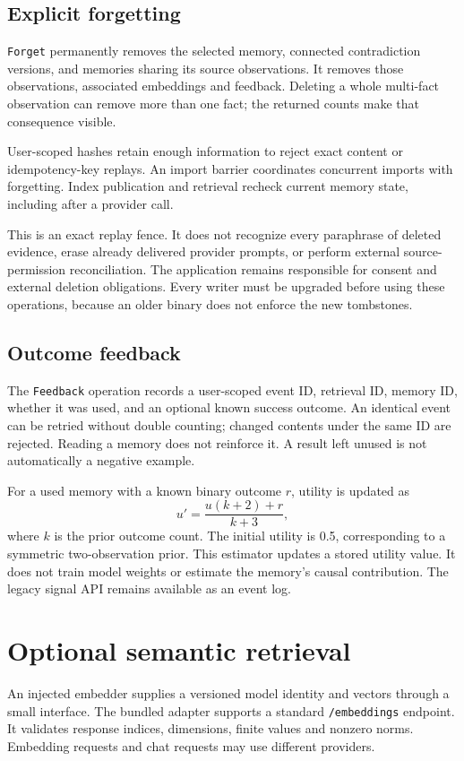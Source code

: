 \documentclass[11pt]{article}
\begin{document}
\subsection{Explicit forgetting}
\texttt{Forget} permanently removes the selected memory, connected contradiction versions, and memories sharing its source observations. It removes those observations, associated embeddings and feedback. Deleting a whole multi-fact observation can remove more than one fact; the returned counts make that consequence visible.

User-scoped hashes retain enough information to reject exact content or idempotency-key replays. An import barrier coordinates concurrent imports with forgetting. Index publication and retrieval recheck current memory state, including after a provider call.

This is an exact replay fence. It does not recognize every paraphrase of deleted evidence, erase already delivered provider prompts, or perform external source-permission reconciliation. The application remains responsible for consent and external deletion obligations. Every writer must be upgraded before using these operations, because an older binary does not enforce the new tombstones.

\subsection{Outcome feedback}
The \texttt{Feedback} operation records a user-scoped event ID, retrieval ID, memory ID, whether it was used, and an optional known success outcome. An identical event can be retried without double counting; changed contents under the same ID are rejected. Reading a memory does not reinforce it. A result left unused is not automatically a negative example.

For a used memory with a known binary outcome $r$, utility is updated as
\[
u'=\frac{u(k+2)+r}{k+3},
\]
where $k$ is the prior outcome count. The initial utility is 0.5, corresponding to a symmetric two-observation prior. This estimator updates a stored utility value. It does not train model weights or estimate the memory's causal contribution. The legacy signal API remains available as an event log.

\section{Optional semantic retrieval}
An injected embedder supplies a versioned model identity and vectors through a small interface. The bundled adapter supports a standard \texttt{/embeddings} endpoint. It validates response indices, dimensions, finite values and nonzero norms. Embedding requests and chat requests may use different providers.
\end{document}
